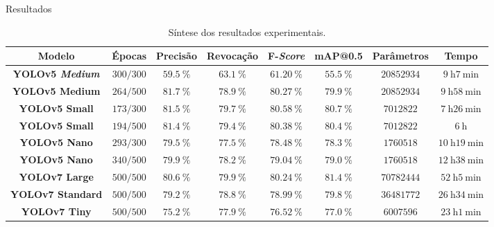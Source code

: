 \begin{frame}[shrink=8]{Resultados}
\begin{table}[h!]
\caption{Síntese dos resultados experimentais.} \label{tab:resultadosExperimentais}
\begin{footnotesize}
\begin{tabular}{cccccccc}
\toprule
\textbf{Modelo} & \textbf{Épocas} &\textbf{Precisão} & \textbf{Revocação} & \textbf{F-\emph{Score}} & \textbf{mAP@0.5} & \textbf{Parâmetros} & \textbf{Tempo}\\
\midrule
\textbf{YOLOv5 \emph{Medium}} & $300/300$ & $\SI{59,5}{\percent}$ & $\SI{63,1}{\percent}$ & $\SI{61,20}{\percent}$ & $\SI{55,5}{\percent}$ & $\num{20852934}$ & $\SI{9}{\hour}\SI{7}{\minute}$\\
\textbf{YOLOv5 Medium} & $264/500$ & $\SI{81,7}{\percent}$ & $\SI{78,9}{\percent}$ & $\SI{80,27}{\percent}$ & $\SI{79,9}{\percent}$ & $\num{20852934}$ & $\SI{9}{\hour}\SI{58}{\minute}$\\
\textbf{YOLOv5 Small} & $173/300$ & $\SI{81,5}{\percent}$ & $\SI{79,7}{\percent}$ & $\SI{80,58}{\percent}$ & $\SI{80,7}{\percent}$ & $\num{7012822}$ & $\SI{7}{\hour}\SI{26}{\minute}$\\
\textbf{YOLOv5 Small} & $194/500$ & $\SI{81,4}{\percent}$ & $\SI{79,4}{\percent}$ & $\SI{80,38}{\percent}$ & $\SI{80,4}{\percent}$ & $\num{7012822}$ & $\SI{6}{\hour}$\\
\textbf{YOLOv5 Nano} & $293/300$ & $\SI{79,5}{\percent}$ & $\SI{77,5}{\percent}$ & $\SI{78,48}{\percent}$ & $\SI{78,3}{\percent}$ & $\num{1760518}$ & $\SI{10}{\hour}\SI{19}{\minute}$\\
\textbf{YOLOv5 Nano} & $340/500$ & $\SI{79,9}{\percent}$ & $\SI{78,2}{\percent}$ & $\SI{79,04}{\percent}$ & $\SI{79,0}{\percent}$ & $\num{1760518}$ & $\SI{12}{\hour}\SI{38}{\minute}$\\
\midrule
\textbf{YOLOv7 Large} & $500/500$ & $\SI{80,6}{\percent}$ & $\SI{79,9}{\percent}$ & $\SI{80,24}{\percent}$ & $\SI{81,4}{\percent}$ & $\num{70782444}$ & $\SI{52}{\hour}\SI{5}{\minute}$\\
\textbf{YOLOv7 Standard} & $500/500$ & $\SI{79,2}{\percent}$ & $\SI{78,8}{\percent}$ & $\SI{78,99}{\percent}$ & $\SI{79,8}{\percent}$ & $\num{36481772}$ & $\SI{26}{\hour}\SI{34}{\minute}$\\
\textbf{YOLOv7 Tiny} & $500/500$ & $\SI{75,2}{\percent}$ & $\SI{77,9}{\percent}$ & $\SI{76,52}{\percent}$ & $\SI{77,0}{\percent}$ & $\num{6007596}$ & $\SI{23}{\hour}\SI{1}{\minute}$\\

\bottomrule
\end{tabular}
\end{footnotesize}
\end{table}
\end{frame}

